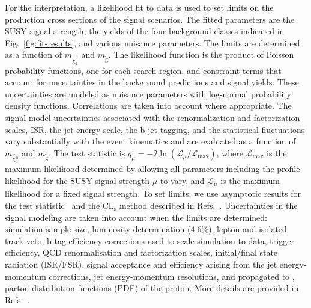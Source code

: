 For the interpretation, a likelihood fit to data is used to set limits on
the production cross sections of the signal scenarios.
The fitted parameters are the SUSY signal strength,
the yields of the four background classes indicated in Fig.~\ref{fig:fit-results},
and various nuisance parameters.
The limits are determined as a function of $m_{\tilde{\chi}^{0}_{1}}$ and $m_{\tilde{\text{g}}}$.
The likelihood function is the product of Poisson probability functions,
one for each search region,
and constraint terms that account for
uncertainties in the background predictions and signal yields.
These uncertainties are modeled as nuisance parameters
with log-normal probability density functions.
Correlations are taken into account where appropriate.
The signal model uncertainties associated with
the renormalization and factorization scales, ISR,
the jet energy scale,
the b-jet tagging,
and the statistical fluctuations
vary substantially with the event kinematics
and are evaluated as a function of $m_{\tilde{\chi^{0}_{1}}}$ and $m_{\tilde{\text{g}}}$.
The test statistic is
$q_\mu =  - 2 \ln \left( \mathcal{L}_\mu/\mathcal{L}_\text{max} \right)$,
where $\mathcal{L}_\text{max}$ is the maximum likelihood
determined by allowing all parameters including the profile likelihood for the
SUSY signal strength $\mu$ to vary,
and $\mathcal{L}_\mu$ is the maximum likelihood for a fixed signal strength.
To set limits,
we use asymptotic results for the test statistic~\cite{Cowan:2010js}
and the CL$_\mathrm{s}$
method described in Refs.~\cite{Junk1999,bib-cls}. 
Uncertainties in the signal modeling are taken into account when the limits are determined: simulation sample size, luminosity determination ($4.6\%$), lepton and isolated track veto, b-tag efficiency corrections used to scale simulation to data, trigger efficiency, QCD renormalisation and factorization scales, initial/final state radiation (ISR/FSR), signal acceptance and efficiency arising from the jet energy-momentum corrections, jet energy-momentum resolutions, and propagated to \MET, parton distribution functions (PDF) of the proton. More details are provided in Refs.~\cite{cms-note-2011-005,Khachatryan:2015vra}.

